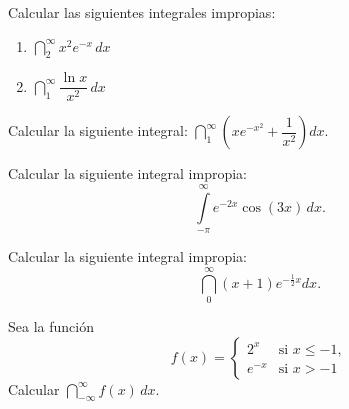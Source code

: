 
{Calcular las siguientes integrales impropias:
\begin{multicols}{2}
\begin{enumerate}
\item $\dint\limits_{2}^{\infty }x^{2}e^{-x}\,dx$
\item $\dint\limits_{1}^{\infty }\dfrac{\ln x}{x^{2}}\,dx$
\end{enumerate}
\end{multicols}
}


{Calcular la siguiente integral: $\dint\limits_{1}^{\infty }\left(xe^{-x^{2}}+\dfrac{1}{x^{2}}\right) dx.$
}


{Calcular la siguiente integral impropia:
\[
\int\limits_{ - \pi }^\infty  {e^{ - 2x} \cos (3x)\,dx}.
\]
}


{Calcular la siguiente integral impropia:
\[
\dint\limits_{0}^{\infty }(x+1)e^{-\tfrac{1}{2}x}dx.
\]
}


{Sea la función
\[
f(x) =
\begin{cases}
2^x & \mbox{si $x\leq -1$},\\
e^{-x} & \mbox{si $x > -1$}
\end{cases} 
\]
Calcular $\dint\limits_{-\infty }^\infty f(x)\,dx$.
}


